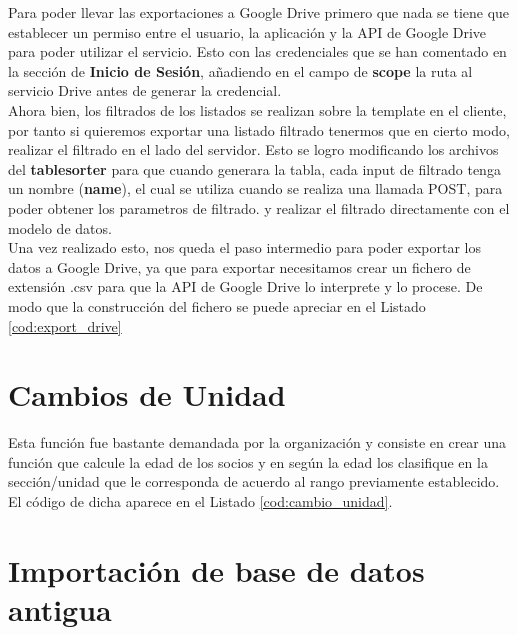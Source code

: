 Para poder llevar las exportaciones a Google Drive primero que nada se tiene que establecer un permiso entre el  usuario, la aplicación y la API de Google Drive para poder utilizar el servicio. Esto con las credenciales que se han
comentado en la sección de \textbf{Inicio de Sesión}, añadiendo en el campo de \textbf{scope} la ruta al servicio Drive antes de generar la credencial.\\

Ahora bien, los filtrados de los listados se realizan sobre la template en el cliente, por tanto si quieremos exportar una listado filtrado tenermos que en cierto modo, realizar el filtrado en el lado del servidor.
Esto se logro modificando los archivos del \textbf{tablesorter} para que cuando generara la tabla, cada input de filtrado tenga un nombre (\textbf{name}), el cual se utiliza cuando se realiza una llamada POST, para poder obtener los parametros de filtrado.
y realizar el filtrado directamente con el modelo de datos.\\

Una vez realizado esto, nos queda el paso intermedio para poder exportar los datos a Google Drive, ya que para exportar necesitamos crear un fichero de extensión .csv para que la API de Google Drive lo interprete y lo procese.
De modo que la construcción del fichero se puede apreciar en el Listado \ref{cod:export_drive}\\



\section{Cambios de Unidad}
\label{4:sec10}

Esta función fue bastante demandada por la organización y consiste en crear una función que calcule la edad de los socios y en según la edad los clasifique en la sección/unidad que le corresponda de acuerdo al rango previamente
establecido.\\

El código de dicha aparece en el Listado \ref{cod:cambio_unidad}.\\



\section{Importación de base de datos antigua}
\label{4:sec11}


